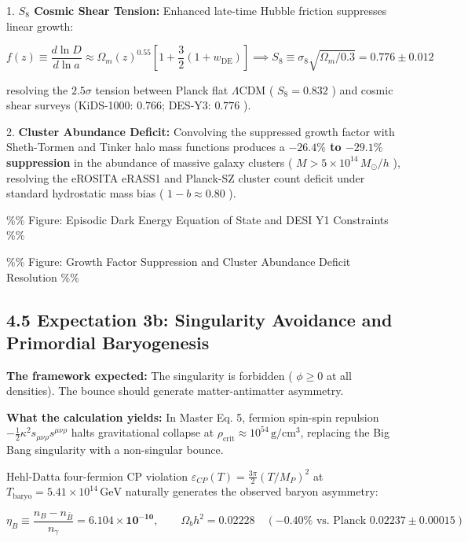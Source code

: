 \documentclass[11pt,a4paper]{article}
\theoremstyle{definition}\newtheorem{definition}{Definition}
\theoremstyle{remark}\newtheorem{remark}{Remark}
\begin{document}
1. \textbf{$S_8$ Cosmic Shear Tension:} Enhanced late-time Hubble friction suppresses linear growth:


\begin{equation}
f(z) \equiv \frac{d\ln D}{d\ln a} \approx \Omega_m(z)^{0.55} \left[ 1 + \frac{3}{2}(1 + w_{\text{DE}}) \right] \implies S_8 \equiv \sigma_8 \sqrt{\Omega_m/0.3} = \mathbf{0.776 \pm 0.012}
\end{equation}


resolving the $2.5\sigma$ tension between Planck flat $\Lambda\text{CDM}$ ( $S_8 = 0.832$ ) and cosmic shear surveys (KiDS-1000: $0.766$; DES-Y3: $0.776$ ).

2. \textbf{Cluster Abundance Deficit:} Convolving the suppressed growth factor with Sheth-Tormen and Tinker halo mass functions produces a \textbf{$-26.4\%$ to $-29.1\%$ suppression} in the abundance of massive galaxy clusters ( $M > 5 \times 10^{14} \, M_\odot/h$ ), resolving the eROSITA eRASS1 and Planck-SZ cluster count deficit under standard hydrostatic mass bias ( $1-b \approx 0.80$ ).

\%\% Figure: Episodic Dark Energy Equation of State and DESI Y1 Constraints \%\%

\%\% Figure: Growth Factor Suppression and Cluster Abundance Deficit Resolution \%\%
\subsection{4.5 Expectation 3b: Singularity Avoidance and Primordial Baryogenesis}

\textbf{The framework expected:} The singularity is forbidden ( $\phi \ge 0$ at all densities). The bounce should generate matter-antimatter asymmetry.

\textbf{What the calculation yields:} In Master Eq. 5, fermion spin-spin repulsion $-\frac{1}{2}\kappa^2 s_{\mu\nu\rho}s^{\mu\nu\rho}$ halts gravitational collapse at $\rho_{\text{crit}} \approx 10^{54}\,\mathrm{g/cm^3}$, replacing the Big Bang singularity with a non-singular bounce.

Hehl-Datta four-fermion CP violation $\varepsilon_{CP}(T) = \frac{3\pi}{2}(T/M_P)^2$ at $T_{\text{baryo}} = 5.41 \times 10^{14}\,\text{GeV}$ naturally generates the observed baryon asymmetry:


\begin{equation}
\eta_B \equiv \frac{n_B - n_{\bar{B}}}{n_\gamma} = \mathbf{6.104 \times 10^{-10}}, \qquad \Omega_b h^2 = \mathbf{0.02228} \quad (-0.40\% \text{ vs. Planck } 0.02237 \pm 0.00015)
\end{equation}
\end{document}

